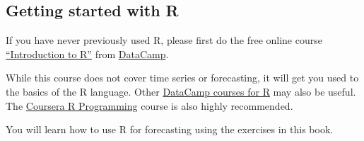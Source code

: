 \documentclass[]{book}
\begin{document}
\hypertarget{getting-started-with-r}{%
\subsection*{Getting started with R}\label{getting-started-with-r}}

If you have never previously used R, please first do the free online course \href{https://www.datacamp.com/courses/free-introduction-to-r}{``Introduction to R''} from \href{http://datacamp.com}{DataCamp}.

While this course does not cover time series or forecasting, it will get you used to the basics of the R language. Other \href{https://www.datacamp.com/courses/tech:r}{DataCamp courses for R} may also be useful. The \href{https://www.coursera.org/learn/r-programming}{Coursera R Programming} course is also highly recommended.

You will learn how to use R for forecasting using the exercises in this book.


\end{document}
